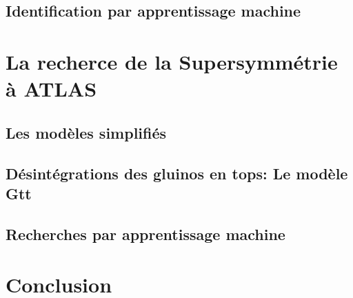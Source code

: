 \documentclass[12pt,canadien]{article}
\begin{document}
\subsection{Identification par apprentissage machine}
\label{sec:top:ml}

\singlespacing{}
\section{La recherce de la Supersymmétrie à ATLAS}
\label{susy_atlas}
\doublespacing{}

\subsection{Les modèles simplifiés}
\label{sec:susy_atlas:modele_simple}

\subsection{Désintégrations des gluinos en tops: Le modèle Gtt}
\label{sec:susy_atlas:gtt}

\subsection{Recherches par apprentissage machine}
\label{sec:susy_atlas:ml}

\section{Conclusion}
\label{sec:conclusion}
\end{document}
